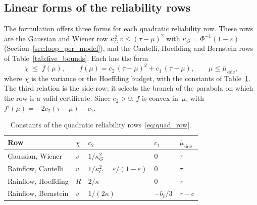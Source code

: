 \documentclass[11pt,a4paper]{article}
\theoremstyle{plain}
\theoremstyle{definition}
\theoremstyle{remark}
\begin{document}
\subsection{Linear forms of the reliability rows}
\label{sec:linear_forms}

The formulation offers three forms for each quadratic reliability row.
These rows are the Gaussian and Wiener row $\kappa_G^2\, v \le (\tau - \mu)^2$ with $\kappa_G = \Phi^{-1}(1-\varepsilon)$ (Section~\ref{sec:loop_per_model}), and the Cantelli, Hoeffding and Bernstein rows of Table~\ref{tab:five_bounds}.
Each has the form
\begin{equation}\label{eq:quad_row}
  \chi \;\le\; f(\mu), \qquad f(\mu) = c_2\,(\tau - \mu)^2 + c_1\,(\tau - \mu), \qquad \mu \le \bar\mu_{\mathrm{side}},
\end{equation}
where $\chi$ is the variance or the Hoeffding budget, with the constants of Table~\ref{tab:quad_constants}.
The third relation is the side row; it selects the branch of the parabola on which the row is a valid certificate.
Since $c_2 > 0$, $f$ is convex in~$\mu$, with $f'(\mu) = -2c_2(\tau - \mu) - c_1$.

\begin{table}[htbp]
\centering
\caption{Constants of the quadratic reliability rows~\eqref{eq:quad_row}.}
\label{tab:quad_constants}
\small
\begin{tabular}{@{}lllll@{}}
\toprule
\rowcolor{headgrey}
\textbf{Row} & $\chi$ & $c_2$ & $c_1$ & $\bar\mu_{\mathrm{side}}$ \\
\midrule
Gaussian, Wiener   & $v$ & $1/\kappa_G^2$ & $0$ & $\tau$ \\
Rainflow, Cantelli & $v$ & $1/\kappa_C^2 = \varepsilon/(1-\varepsilon)$ & $0$ & $\tau$ \\
Rainflow, Hoeffding & $R$ & $2/\kappa$ & $0$ & $\tau$ \\
Rainflow, Bernstein & $v$ & $1/(2\kappa)$ & $-b_\ell/3$ & $\tau - c$ \\
\bottomrule
\end{tabular}
\end{table}
\end{document}
